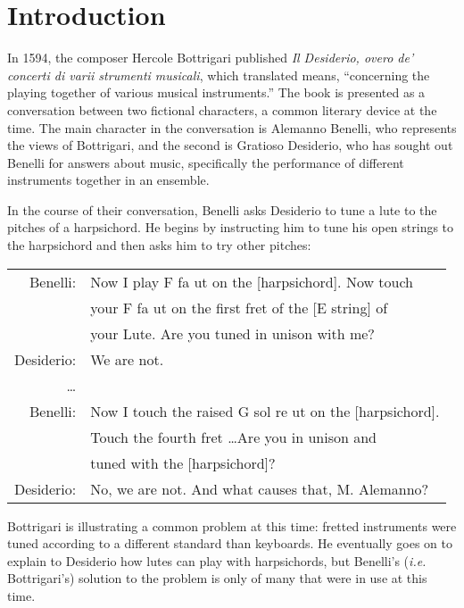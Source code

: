 \chapter*{Introduction}

In 1594, the composer Hercole Bottrigari published 
\textit{Il Desiderio, overo de' concerti di varii strumenti musicali}, which 
translated means, ``concerning the playing together of various musical instruments.''
The book is presented as a conversation between two fictional characters, a common 
literary device at the time.  The main character in the conversation is
Alemanno Benelli, who represents the views of Bottrigari, and the second
is Gratioso Desiderio, who has sought out Benelli for answers about music,
specifically the performance of different instruments together in an ensemble.

In the course of their conversation, Benelli asks Desiderio to tune a lute to
the pitches of a harpsichord.  He begins by instructing him to tune his open
strings to the harpsichord and then asks him to try other pitches: \autocite[18]{HB:1}

\begin{blocks}
\begin{center}
\begin{tabular}{r l}
Benelli:   & Now I play F fa ut on the [harpsichord]. Now touch       \\
           & your F fa ut on the first fret of the [E string] of      \\
           & your Lute. Are you tuned in unison with me?              \\
Desiderio: & We are not.                                              \\
\ldots     &                                                          \\
Benelli:   & Now I touch the raised G sol re ut on the [harpsichord]. \\ 
           & Touch the fourth fret \ldots Are you in unison and       \\
           & tuned with the [harpsichord]?                            \\
Desiderio: & No, we are not. And what causes that, M. Alemanno?       \\
\end{tabular}
\end{center}
\end{blocks}

Bottrigari is illustrating a common problem at this time: fretted instruments
were tuned according to a different standard than keyboards. He eventually goes
on to explain to Desiderio how lutes can play with harpsichords, but Benelli's
(\textit{i.e.} Bottrigari's) solution to the problem is only of many that  were
in use at this time.
  

